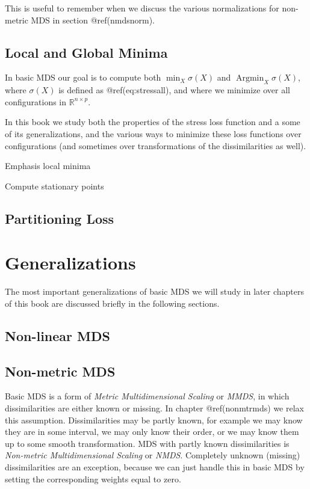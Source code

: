 \documentclass[
  12pt,
  letterpaper,
  DIV=11,
  numbers=noendperiod]{scrartcl}
\begin{document}
This is useful to remember when we discuss the various normalizations
for non-metric MDS in section @ref(nmdsnorm).

\subsection{Local and Global Minima}\label{seclocglob}

In basic MDS our goal is to compute both \(\min_X\sigma(X)\) and
\(\mathop{\text{Argmin}}_X\sigma(X)\), where \(\sigma(X)\) is defined as
@ref(eq:stressall), and where we minimize over all configurations in
\(\mathbb{R}^{n\times p}\).

In this book we study both the properties of the stress loss function
and a some of its generalizations, and the various ways to minimize
these loss functions over configurations (and sometimes over
transformations of the dissimilarities as well).

Emphasis local minima

Compute stationary points

\subsection{Partitioning Loss}\label{partitioning-loss}

\section{Generalizations}\label{introgeneralize}

The most important generalizations of basic MDS we will study in later
chapters of this book are discussed briefly in the following sections.

\subsection{Non-linear MDS}\label{non-linear-mds}

\subsection{Non-metric MDS}\label{gennonmetric}

Basic MDS is a form of \emph{Metric Multidimensional Scaling} or
\emph{MMDS}, in which dissimilarities are either known or missing. In
chapter @ref(nonmtrmds) we relax this assumption. Dissimilarities may be
partly known, for example we may know they are in some interval, we may
only know their order, or we may know them up to some smooth
transformation. MDS with partly known dissimilarities is
\emph{Non-metric Multidimensional Scaling} or \emph{NMDS}. Completely
unknown (missing) dissimilarities are an exception, because we can just
handle this in basic MDS by setting the corresponding weights equal to
zero.
\end{document}
